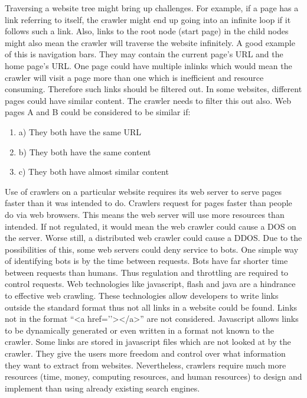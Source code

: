 \noindent
Traversing a website tree might bring up challenges. For example, if a page has a link referring to itself, the crawler might end up going into an infinite loop if it follows such a link. Also, links to the root node (start page) in the child nodes might also mean the crawler will traverse the website infinitely. A good example of this is navigation bars. They may contain the current page’s URL and the home page’s URL. One page could have multiple inlinks which would mean the crawler will visit a page more than one which is inefficient and resource consuming. Therefore such links should be filtered out. In some websites, different pages could have similar content. The crawler needs to filter this out also. Web pages A and B could be considered to be similar if:
\begin{enumerate}
\item a) They both have the same URL
\item b) They both have the same content
\item c) They both have almost similar content
\end{enumerate}

\noindent
Use of crawlers on a particular website requires its web server to serve pages faster than it was intended to do. Crawlers request for pages faster than people do via web browsers. This means the web server will use more resources than intended. If not regulated, it would mean the web crawler could cause a DOS on the server. Worse still, a distributed web crawler could cause a DDOS. Due to the possibilities of this, some web servers could deny service to bots. One simple way of identifying bots is by the time between requests. Bots have far shorter time between requests than humans. Thus regulation and throttling are required to control requests. Web technologies like javascript, flash and java are a hindrance to effective web crawling. These technologies allow developers to write links outside the standard format thus not all links in a website could be found. Links not in the format “<a href=’’></a>” are not considered. Javascript allows links to be dynamically generated or even written in a format not known to the crawler. Some links are stored in javascript files which are not looked at by the crawler. They give the users more freedom and control over what information they want to extract from websites. Nevertheless, crawlers require much more resources (time, money, computing resources, and human resources) to design and implement than using already existing search engines.

